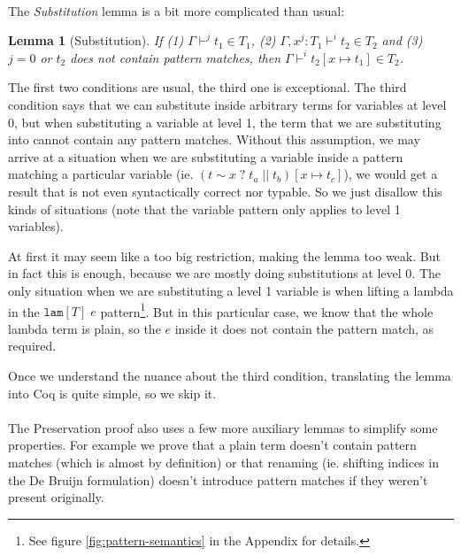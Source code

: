\documentclass[runningheads]{article}
\newcommand{\patlam}[2]{\texttt{lam}[#2]\;#1}
\newtheorem*{lemma}{Lemma}
\begin{document}
\paragraph{}

The \textit{Substitution} lemma is a bit more complicated than usual:
\begin{lemma}[Substitution]
If (1) $\Gamma \vdash^j t_1 \in T_1$, (2) $\Gamma, x^j : T_1 \vdash^i t_2 \in T_2$ and
(3) $j = 0$ or $t_2$ does not contain pattern matches, then $\Gamma \vdash^i t_2[x \mapsto t_1] \in T_2$.
\end{lemma}

The first two conditions are usual, the third one is exceptional.
The third condition says that we can substitute inside arbitrary terms for variables at level 0, but when substituting a variable at level 1, the term that we are substituting into cannot contain any pattern matches. Without this assumption, we may arrive at a situation when we are substituting a variable inside a pattern matching a particular variable (ie. $(t \sim x \; ? \; t_a \; || \; t_b)[x \mapsto t_c]$), we would get a result that is not even syntactically correct nor typable. So we just disallow this kinds of situations (note that the variable pattern only applies to level 1 variables). 

At first it may seem like a too big restriction, making the lemma too weak. But in fact this is enough, because we are mostly doing substitutions at level 0. The only situation when we are substituting a level 1 variable is when lifting a lambda in the $\patlam{e}{T}$ pattern\footnote{See figure \ref{fig:pattern-semantics} in the Appendix for details.}. But in this particular case, we know that the whole lambda term is plain, so the $e$ inside it does not contain the pattern match, as required.

Once we understand the nuance about the third condition, translating the lemma into Coq is quite simple, so we skip it.

\paragraph{}

The Preservation proof also uses a few more auxiliary lemmas to simplify some properties. For example we prove that a plain term doesn't contain pattern matches (which is almost by definition) or that renaming (ie. shifting indices in the De Bruijn formulation) doesn't introduce pattern matches if they weren't present originally. %
\end{document}
